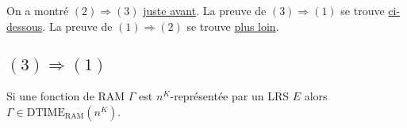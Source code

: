 \documentclass{article}
\newcommand{\dtimeramarg}[1]{\text{DTIME}_{\text{RAM}}\left( n^{#1} \right)}
\begin{document}
	On a montré $(2) \Rightarrow (3)$ \hyperref[conj:rep_LSRS_rep_LRS]{juste avant}. 
	La preuve de $(3) \Rightarrow (1)$ se trouve \hyperref[conj:rep_LRS_calc_n_K]{ci-dessous}.
	La preuve de $(1) \Rightarrow (2)$ se trouve \hyperref[conj:poly_implique_LSRS]{plus loin}.
	
	
	\subsection{$(3) \Rightarrow (1)$}
		\label{subsec:LRS_implique_poly}
		
		\begin{conj}
			\label{conj:rep_LRS_calc_n_K}
			Si une fonction de RAM $\Gamma$ est $n^K$-représentée par un LRS $E$ alors $\Gamma \in \dtimeramarg{K}$.
		\end{conj}
		
\end{document}
